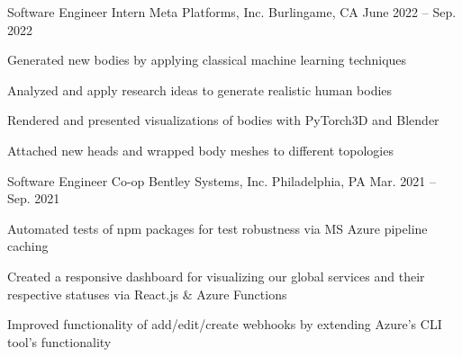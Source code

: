 

\begin{cventries}
  \cventry
  {Software Engineer Intern} %
  {Meta Platforms, Inc.} %
  {Burlingame, CA} %
  {June 2022 -- Sep. 2022} %
  {
    \begin{cvitems} %
      \item {Generated new bodies by applying classical machine learning techniques}
      \item {Analyzed and apply research ideas to generate realistic human bodies}
      \item {Rendered and presented visualizations of bodies with PyTorch3D and Blender}
      \item {Attached new heads and wrapped body meshes to different topologies}
    \end{cvitems}
  }

  \cventry
  {Software Engineer Co-op} %
  {Bentley Systems, Inc.} %
  {Philadelphia, PA} %
  {Mar. 2021 -- Sep. 2021} %
  {
    \begin{cvitems} %
      \item {Automated tests of npm packages for test robustness via MS Azure pipeline caching}
      \item {Created a responsive dashboard for visualizing our global services and their respective statuses via React.js \& Azure Functions}
      \item {Improved functionality of add/edit/create webhooks by extending Azure's CLI tool's functionality}
    \end{cvitems}
  }


\end{cventries}
